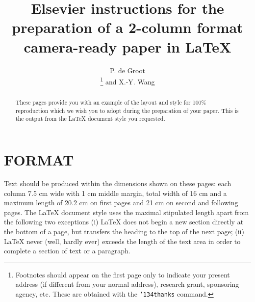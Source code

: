 
\newcommand{\ttbs}{\char'134}
\newcommand{\AmS}{{\protect\the\textfont2
  A\kern-.1667em\lower.5ex\hbox{M}\kern-.125emS}}


\title{Elsevier instructions for the preparation of a
       2-column format camera-ready paper in \LaTeX}

\author{P. de Groot\address{Mathematics and Computer Science Division, 
        Elsevier Science Publishers B.V., \\ 
        P.O. Box 103, 1000 AC Amsterdam, The Netherlands}%
        \thanks{Footnotes should appear on the first page only to
                indicate your present address (if different from your
                normal address), research grant, sponsoring agency, etc.
                These are obtained with the {\tt\ttbs thanks} command.}
        and 
        X.-Y. Wang\address{Economics Department, University of Winchester, \\
        2 Finch Road, Winchester, Hampshire P3L T19, United Kingdom}}
       


\begin{abstract}
These pages provide you with an example of the layout and style for
100\% reproduction which we wish you to adopt during the preparation of
your paper. This is the output from the \LaTeX{} document style you
requested.
\end{abstract}

\maketitle

\section{FORMAT}

Text should be produced within the dimensions shown on these pages:
each column 7.5 cm wide with 1 cm middle margin, total width of 16 cm
and a maximum length of 20.2 cm on first pages and 21 cm on second and
following pages. The \LaTeX{} document style uses the maximal stipulated
length apart from the following two exceptions (i) \LaTeX{} does not
begin a new section directly at the bottom of a page, but transfers the
heading to the top of the next page; (ii) \LaTeX{} never (well, hardly
ever) exceeds the length of the text area in order to complete a
section of text or a paragraph.


